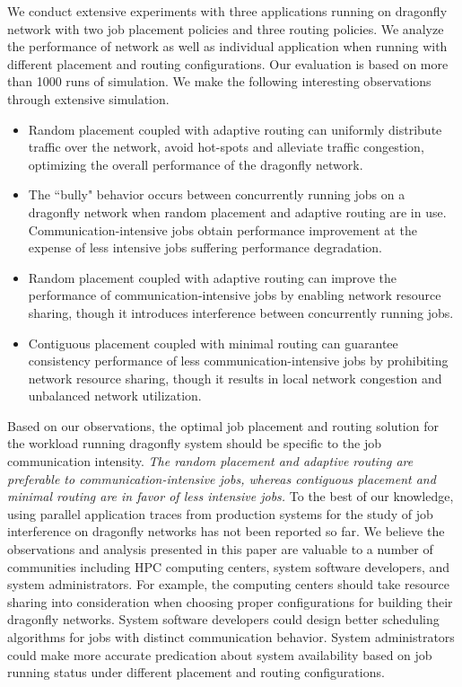 \documentclass[conference,compsoc]{IEEEtran}
\begin{document}
We conduct extensive experiments with three applications running on dragonfly network with two job placement policies and three routing policies. We analyze the performance of network as well as individual application when running with different placement and routing configurations. Our evaluation is based on more than 1000 runs of simulation. We make the following interesting observations through extensive simulation.


\begin{itemize}
   
    \item Random placement coupled with adaptive routing can uniformly distribute traffic over the network, avoid hot-spots and alleviate traffic congestion, optimizing the overall performance of the dragonfly network. 
    
    \item The ``bully" behavior occurs between concurrently running jobs on a dragonfly network when random placement and adaptive routing are in use. Communication-intensive jobs obtain performance improvement at the expense of less intensive jobs suffering performance degradation. 
    
    \item Random placement coupled with adaptive routing can improve the performance of communication-intensive jobs by enabling network resource sharing, though it introduces interference between concurrently running jobs.
    
    \item Contiguous placement coupled with minimal routing can guarantee consistency performance of less communication-intensive jobs by prohibiting network resource sharing, though it results in local network congestion and unbalanced network utilization.
    
\end{itemize}

Based on our observations, the optimal job placement and routing solution for the workload running dragonfly system should be specific to the job communication intensity. \emph{The random placement and adaptive routing are preferable to communication-intensive jobs, whereas contiguous placement and minimal routing are in favor of less intensive jobs.} To the best of our knowledge, using parallel application traces from production systems for the study of job interference on dragonfly networks has not been reported so far. We believe the observations and analysis presented in this paper are valuable to a number of communities including HPC computing centers, system software developers, and system administrators. For example, the computing centers should take resource sharing into consideration when choosing proper configurations for building their dragonfly networks. System software developers could design better scheduling algorithms for jobs with distinct communication behavior. System administrators could make more accurate predication about system availability based on job running status under different placement and routing configurations.
\end{document}
